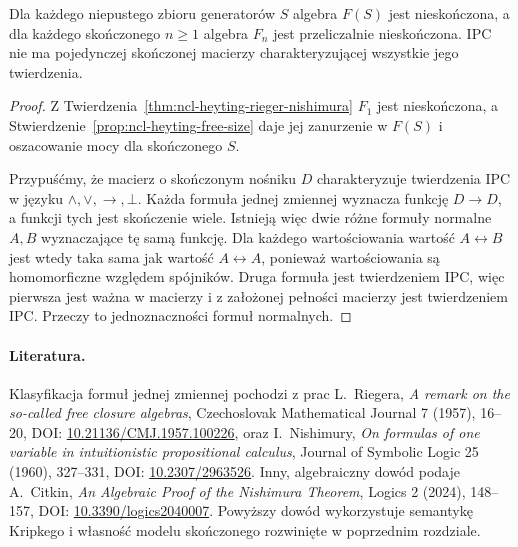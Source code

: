 \begin{wniosek}
\label{cor:ncl-heyting-free-infinite}
Dla każdego niepustego zbioru generatorów $S$
algebra $F(S)$ jest nieskończona, a dla każdego
skończonego $n\geq1$ algebra $F_n$ jest
przeliczalnie nieskończona.
IPC nie ma pojedynczej skończonej macierzy
charakteryzującej wszystkie jego twierdzenia.
\end{wniosek}
\begin{proof}
Z Twierdzenia~\ref{thm:ncl-heyting-rieger-nishimura}
$F_1$ jest nieskończona, a
Stwierdzenie~\ref{prop:ncl-heyting-free-size}
daje jej zanurzenie w $F(S)$ i oszacowanie
mocy dla skończonego $S$.

Przypuśćmy, że macierz o skończonym nośniku
$D$ charakteryzuje twierdzenia IPC w języku
$\wedge,\vee,\to,\bot$.
Każda formuła jednej zmiennej wyznacza funkcję
$D\to D$, a funkcji tych jest skończenie wiele.
Istnieją więc dwie różne formuły normalne
$A,B$ wyznaczające tę samą funkcję.
Dla każdego wartościowania wartość
$A\leftrightarrow B$ jest wtedy taka sama
jak wartość $A\leftrightarrow A$,
ponieważ wartościowania są homomorficzne
względem spójników.
Druga formuła jest twierdzeniem IPC,
więc pierwsza jest ważna w macierzy
i z założonej pełności macierzy jest
twierdzeniem IPC. Przeczy to jednoznaczności
formuł normalnych.
\end{proof}

\paragraph{Literatura.}
Klasyfikacja formuł jednej zmiennej pochodzi
z prac L.~Riegera, \emph{A remark on the
so-called free closure algebras},
Czechoslovak Mathematical Journal 7 (1957), 16--20,
DOI: \href{https://doi.org/10.21136/CMJ.1957.100226}
{10.21136/CMJ.1957.100226},
oraz I.~Nishimury, \emph{On formulas of one variable
in intuitionistic propositional calculus},
Journal of Symbolic Logic 25 (1960), 327--331,
DOI: \href{https://doi.org/10.2307/2963526}
{10.2307/2963526}.
Inny, algebraiczny dowód podaje A.~Citkin,
\emph{An Algebraic Proof of the Nishimura Theorem},
Logics 2 (2024), 148--157,
DOI: \href{https://doi.org/10.3390/logics2040007}
{10.3390/logics2040007}.
Powyższy dowód wykorzystuje semantykę Kripkego
i własność modelu skończonego rozwinięte
w poprzednim rozdziale.
